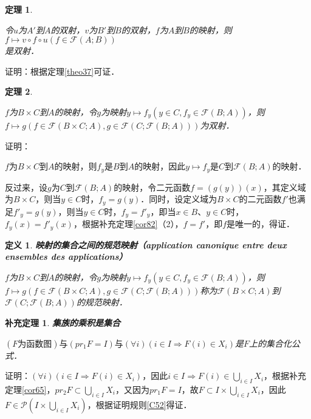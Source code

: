 \documentclass[12pt, a4paper, oneside]{book}
\newtheorem{theo}{定理}
\newtheorem{cor}{补充定理}
\newtheorem{de}{定义}
\begin{document}
			\begin{theo}\label{theo38}
				\hfill\par
				令$u$为$A'$到$A$的双射，$v$为$B'$到$B$的双射，$f$为$A$到$B$的映射，则$f\mapsto v\circ f\circ u(f\in \mathcal{F}(A; B))$\\是双射．
			\end{theo}
			证明：根据定理\ref{theo37}可证．
						
			\begin{theo}\label{theo39}
				\hfill\par
				$f$为$B\times C$到$A$的映射，令$g$为映射$y\mapsto f_y(y\in C, f_y\in \mathcal{F}(B; A))$，则$f\mapsto g(f\in \mathcal{F}(B\times C; A), g\in \mathcal{F}(C; \mathcal{F}(B; A)))$为双射．
			\end{theo}
			证明：
			\par
			$f$为$B\times C$到$A$的映射，则$f_y$是$B$到$A$的映射，因此$y\mapsto f_y$是$C$到$\mathcal{F}(B; A)$的映射．
			\par
			反过来，设$g$为$C$到$\mathcal{F}(B; A)$的映射，令二元函数$f=(g(y))(x)$，其定义域为$B\times C$，则当$y\in C$时，$f_y=g(y)$．同时，设定义域为$B\times C$的二元函数$f'$也满足${f'}_y=g(y)$，则当$y\in C$时，$f_y={f'}_y$，即当$x\in B$、$y\in C$时，$f_y(x)={f'}_y(x)$，根据补充定理\ref{cor82}（2），$f=f'$，即$f$是唯一的，得证．

			\begin{de}
				\textbf{映射的集合之间的规范映射（application canonique entre deux ensembles des applications）}
				\par
				$f$为$B\times C$到$A$的映射，令$g$为映射$y\mapsto f_y(y\in C, f_y\in \mathcal{F}(B; A))$，则$f\mapsto g(f\in \mathcal{F}(B\times C; A), g\in \mathcal{F}(C; \mathcal{F}(B; A)))$称为$\mathcal{F}(B\times C; A)$到$\mathcal{F}(C; \mathcal{F}(B; A))$的规范映射．			
			\end{de}
			
			\begin{cor}\label{cor124}
				\textbf{集族的乘积是集合}\par
				$(F\text{为函数图})\text{与}(pr_1F= I)\text{与}(\forall i)(i\in I\Rightarrow F(i)\in X_i)$是$F$上的集合化公式．
			\end{cor}
			证明：$(\forall i)(i\in I\Rightarrow F(i)\in X_i)$，因此$i\in I\Rightarrow F(i)\in \bigcup\limits_{i\in I}X_i$，根据补充定理\ref{cor65}，$pr_2F\subset \bigcup\limits_{i\in I}X_i$，又因为$pr_1F=I$，故$F\subset I\times \bigcup\limits_{i\in I}X_i$，因此$F\in \mathcal{P}(I\times \bigcup\limits_{i\in I}X_i)$，根据证明规则\ref{C52}得证．
\end{document}
